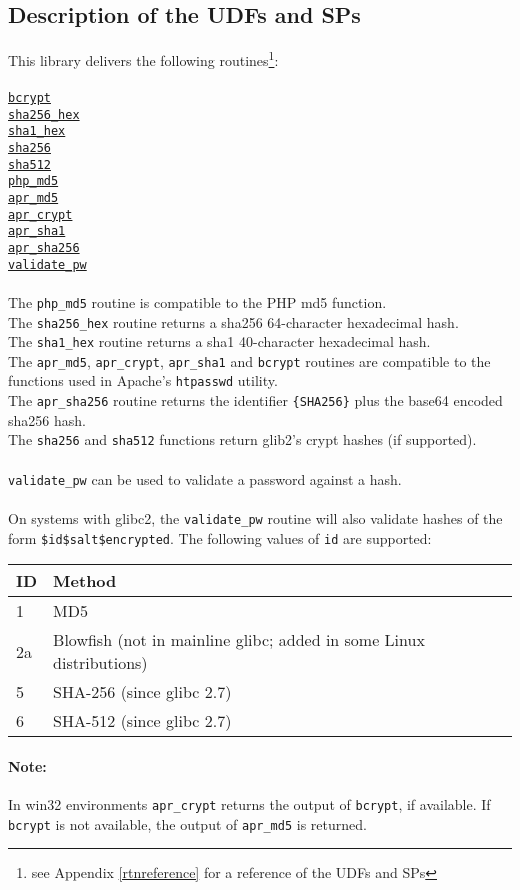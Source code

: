 \subsection{Description of the UDFs and SPs}
This library delivers the following routines\footnote{see Appendix \ref{rtnreference} for a reference of the UDFs and SPs}:\\
\\
\hyperlink{hbcrypt}{\tt bcrypt}\\
\hyperlink{hsha256hex}{\tt sha256\_hex}\\
\hyperlink{hsha1hex}{\tt sha1\_hex}\\
\hyperlink{hsha256}{\tt sha256}\\
\hyperlink{hsha512}{\tt sha512}\\
\hyperlink{hphpmd5}{\tt php\_md5}\\
\hyperlink{haprmd5}{\tt apr\_md5}\\
\hyperlink{haprcrypt}{\tt apr\_crypt}\\
\hyperlink{haprsha1}{\tt apr\_sha1}\\
\hyperlink{haprsha256}{\tt apr\_sha256}\\
\hyperlink{hvalidatepw}{\tt validate\_pw}\\
\\
The {\tt php\_md5} routine is compatible to the PHP md5 function.\\
The {\tt sha256\_hex} routine returns a sha256 64-character hexadecimal hash.\\
The {\tt sha1\_hex} routine returns a sha1 40-character hexadecimal hash.\\
The {\tt apr\_md5}, {\tt apr\_crypt}, {\tt apr\_sha1} and {\tt bcrypt} routines are compatible to the functions used in Apache's {\tt htpasswd} utility.\\
The {\tt apr\_sha256} routine returns the identifier {\tt \{SHA256\}} plus the base64 encoded sha256 hash.\\
The {\tt sha256} and {\tt sha512} functions return glib2's crypt hashes (if supported).\\
\\
{\tt validate\_pw} can be used to validate a password against a hash.\\
\\
On systems with glibc2, the {\tt validate\_pw} routine will also validate hashes of the form \mbox{\tt \$id\$salt\$encrypted}. The following values of {\tt id} are supported:\\

\begin{tabular}{l|l}
 ID  &  Method                                                              \\ \hline
1    &  MD5                                                                 \\
2a   &  Blowfish (not in mainline glibc; added in some Linux distributions) \\
5    &  SHA-256 (since glibc 2.7)                                           \\
6    &  SHA-512 (since glibc 2.7)                                           \\
\end{tabular}

\paragraph{Note:}{In win32 environments {\tt apr\_crypt} returns the output of {\tt bcrypt}, if available. If {\tt bcrypt} is not available, the output of {\tt apr\_md5} is returned.}
